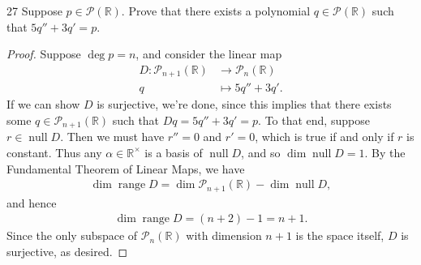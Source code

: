 \documentclass[11pt]{extarticle}
\newenvironment{problem}[1]{\begin{prob*}{#1}{}}{\end{prob*}}
\newcommand{\R}{\mathbb{R}}
\newcommand{\poly}{\mathcal{P}}
\DeclareMathOperator{\Null}{null}
\DeclareMathOperator{\Range}{range}
\begin{document}
\begin{problem}{27}
Suppose $p\in\poly(\R)$.  Prove that there exists a polynomial $q\in\poly(\R)$ such that $5q'' + 3q' = p$.
\end{problem}
\begin{proof}
Suppose $\deg p =n$, and consider the linear map 
\begin{align*}
D: \poly_{n+1}(\R) &\to \poly_n(\R)\\
            q &\mapsto 5q'' + 3q'.
\end{align*}
If we can show $D$ is surjective, we're done, since this implies that there exists some $q\in\poly_{n+1}(\R)$ such that $Dq = 5q'' + 3q' = p$.  To that end, suppose $r \in\Null D$.  Then we must have $r'' = 0$ and $r' = 0$, which is true if and only if $r$ is constant.  Thus any $\alpha\in\R^\times$ is a basis of $\Null D$, and so $\dim\Null D=1$.  By the Fundamental Theorem of Linear Maps, we have 
\begin{align*}
\dim\Range D  =\dim\poly_{n + 1}(\R) -  \dim\Null D,
\end{align*}
and hence
\begin{align*}
\dim\Range D = (n + 2) - 1 = n + 1.
\end{align*}
Since the only subspace of $\poly_n(\R)$ with dimension $n + 1$ is the space itself, $D$ is surjective, as desired.
\end{proof}
\end{document}
